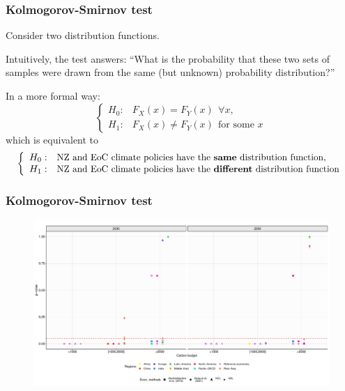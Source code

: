 \begin{frame}
    \frametitle{Kolmogorov-Smirnov test}
    Consider two distribution functions.

    \vspace{0.5cm}
    \pause Intuitively, the test answers: ``What is the probability that these two sets of samples were drawn from
    the same (but unknown) probability distribution?''
    
    \vspace{0.5cm}
    \pause
    In a more formal way:
    \[
    \left\{\begin{array}{ll}
        H_0: & F_X(x) = F_Y(x) \ \  \forall x, \\
        H_1: & F_X(x) \neq F_Y(x) \ \ \text{for some }x
    \end{array}\right.
    \]
    \pause
    which is equivalent to
    \[
    \left\{\begin{array}{ll}
        H_0: & \scalebox{0.95}{\text{NZ and EoC climate policies have the \textbf{same} distribution function},} \\
        H_1: & \scalebox{0.95}{\text{NZ and EoC climate policies have the \textbf{different} distribution function}}
    \end{array}\right.
    \]
\end{frame}

\begin{frame}
    \frametitle{Kolmogorov-Smirnov test}
    \begin{figure}[htb!]
        \centering
        \includegraphics[width = 0.98\linewidth]{Images_statistical_meth/ks_econ_2030_2050.pdf}
    \end{figure}    
    \vfill \hfill \tiny{\cite{rodes-bachs_beyond_ap}}
\end{frame}
